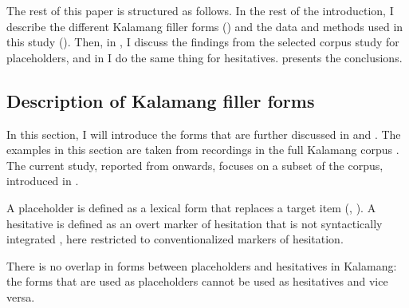 \documentclass[output=paper,colorlinks,citecolor=brown
\ChapterDOI{10.5281/zenodo.15697587}
]{langscibook}
\begin{document}



The rest of this paper is structured as follows. In the rest of the introduction, I describe the different Kalamang filler forms () and the data and methods used in this study (). Then, in , I discuss the findings from the selected corpus study for placeholders, and in  I do the same thing for hesitatives.  presents the conclusions.

\subsection{Description of Kalamang filler forms}
\label{sec:prev}
In this section, I will introduce the forms that are further discussed in  and . The examples in this section are taken from recordings in the full Kalamang corpus \citep{vissercorpus}. The current study, reported from  onwards, focuses on a subset of the corpus, introduced in .

A placeholder is defined as a lexical form that replaces a target item (\citealt[490]{hayashi2006cross}, \citealt[11]{podlesskaya2010}). A hesitative is defined as an overt marker of hesitation that is not syntactically integrated \citep[35]{hayashi2010}, here restricted to conventionalized markers of hesitation.

There is no overlap in forms between placeholders and hesitatives in Kalamang: the forms that are used as placeholders cannot be used as hesitatives and vice versa.
\end{document}
